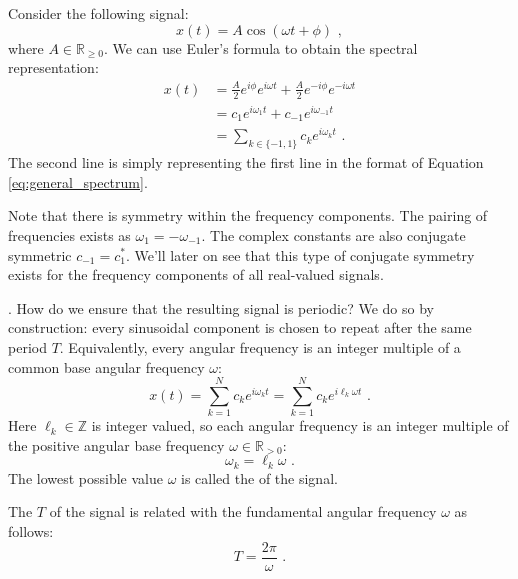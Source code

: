 Consider the following signal:
\begin{equation}
  x(t)=A\cos(\omega t+\phi) \,\,,
\end{equation}
where $A\in \mathbb{R}_{\ge 0}$. We can use Euler's formula to obtain the spectral representation:
\begin{align}
  x(t) & = \frac{A}{2}e^{i\phi}e^{i\omega t} + \frac{A}{2}e^{-i\phi}e^{-i\omega t} \\
       & = c_1 e^{i\omega_1 t} + c_{-1} e^{i\omega_{-1} t}                         \\
       & = \sum_{k\in\{-1,1\}} c_k e^{i\omega_k t} \,\,.
\end{align}
The second line is simply representing the first line in the format of Equation \ref{eq:general_spectrum}.

Note that there is symmetry within the frequency components. The pairing of frequencies exists as $\omega_{1}=-\omega_{-1}$.
The complex constants are also conjugate symmetric $c_{-1} = c_{1}^*$. We'll later on see
that this type of conjugate symmetry exists for the frequency components of all real-valued signals.

. How do we ensure that the resulting signal is periodic? We do so by construction: every sinusoidal component is chosen to repeat after the same period $T$. Equivalently, every angular frequency is an integer multiple of a common base angular frequency $\omega$:
\begin{equation}
  x(t) = \sum_{k=1}^N c_k e^{i \omega_k t} = \sum_{k=1}^N c_k e^{i \ell_k \omega t} \,\,.
  \label{eq:fourier_series_0}
\end{equation}
Here $\ell_k \in \mathbb{Z}$ is integer valued, so each angular frequency is an integer multiple of the positive angular base frequency $\omega \in \mathbb{R}_{>0}$:
\begin{equation}
  \omega_k = \ell_k\omega \,\,.
  \label{eq:integer_multiple}
\end{equation}
The lowest possible value $\omega$ is called
the \emph{} of the signal. 

The \emph{} $T$ of the
signal is related with the fundamental angular frequency $\omega$ as
follows:
\begin{equation}
  \boxed{
    T = \frac{2\pi}{\omega}
  } \,\,.
  \label{eq:fundamental_period}
\end{equation}

